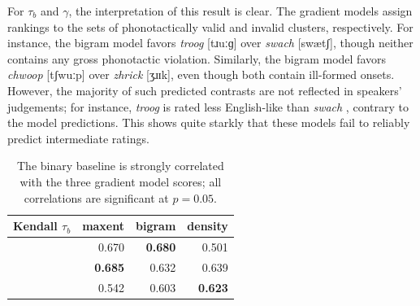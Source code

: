 For $\tau_b$ and $\gamma$, the interpretation of this result is clear. The gradient models assign rankings to the sets of phonotactically valid and invalid clusters, respectively. For instance, the bigram model favors \emph{troog} [tɹuːɡ] over \emph{swach} [swætʃ], though neither contains any gross phonotactic violation. Similarly, the bigram model favors \emph{chwoop} [tʃwuːp] over \emph{zhrick} [ʒɹɪk], even though both contain ill-formed onsets. However, the majority of such predicted contrasts are not reflected in speakers' judgements; for instance, \emph{troog} is rated less English-like than \emph{swach} \citep{Greenberg1964}, contrary to the model predictions. This shows quite starkly that these models fail to reliably predict intermediate ratings.

\begin{table} 
\centering
\begin{tabular}{l r r r}
\toprule
Kendall $\tau_b$          & maxent         & bigram         & density  \\
\midrule
\citealt{Greenberg1964}   & 0.670          & \textbf{0.680} & 0.501 \\
\citealt{Scholes1966}     & \textbf{0.685} & 0.632          & 0.639 \\
\citealt{Albright2003b}   & 0.542          & 0.603          & \textbf{0.623} \\
\bottomrule
\end{tabular}
\caption{The binary baseline is strongly correlated with the three gradient model scores; all correlations are significant at $p = 0.05$.}
\label{bcor}
\end{table}

